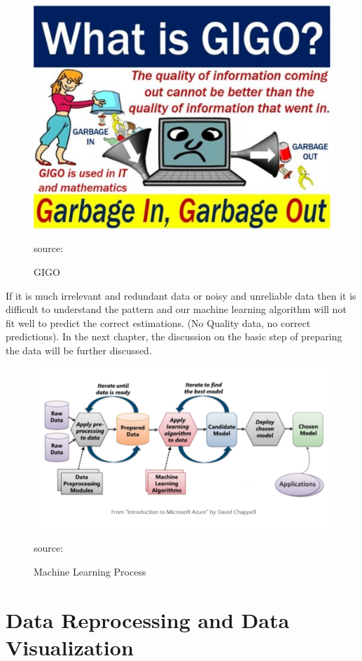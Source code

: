 \documentclass[a4paper,10pt]{article}
\begin{document}
\begin{figure}[H]
	\centering
	\includegraphics[width=0.8\columnwidth]{Pictures/GIGO.jpg}
	\caption[Short title]{GIGO}
	\label{fig:GIGO.}source:\cite{GIGO}
	\end{figure} 
If it is much irrelevant and redundant data or noisy and unreliable data then it is difficult to understand the pattern and our machine learning algorithm will not fit well to predict the correct estimations. (No Quality data, no correct predictions).  In the next chapter, the discussion on the basic step of preparing the data will be further discussed.

\begin{figure}[H]
	\centering
	\includegraphics[width=0.8\columnwidth]{Pictures/ML_Cycles.png}
	\caption[Short title]{Machine Learning Process}
	\label{fig:ML.}source:\cite{David}
	\end{figure}


\section{ Data Reprocessing and Data Visualization}
\end{document}
